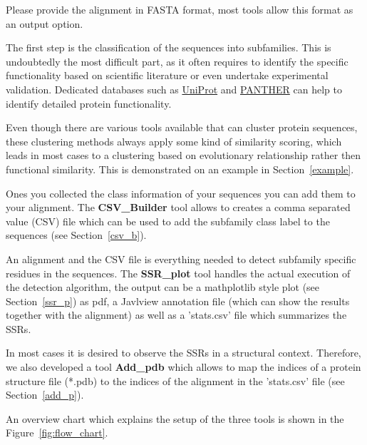 \documentclass[a4paper,10pt]{article}
\begin{document}
Please provide the alignment in FASTA format, most tools allow this format as
an output option.

The first step is the classification of the sequences into subfamilies.
This is undoubtedly the most difficult part, as it often requires 
to identify the specific functionality based on scientific literature
or even undertake experimental validation. Dedicated databases such as 
\href{https://www.uniprot.org/}{UniProt} and \href{http://www.pantherdb.org/downloads/index.jsp}{PANTHER} 
can help to identify 
detailed protein functionality. 

Even though there are various tools available that can cluster protein sequences, 
these clustering methods always apply some kind of similarity scoring,
which leads in most cases to a clustering based on evolutionary relationship 
rather then functional similarity. 
This is demonstrated on an example in Section~\ref{example}.

Ones you collected the class information of your sequences you can add
them to your alignment. The \textbf{CSV\_Builder} tool allows to creates 
a comma separated value (CSV) file which can be used to add the subfamily 
class label to the sequences
(see Section~\ref{csv_b}).

An alignment and the CSV file is everything needed to 
detect subfamily specific residues in the sequences. 
The \textbf{SSR\_plot} tool handles the actual execution of the detection
algorithm, the output can be a mathplotlib \cite{hunter_matplotlib:_2007} style plot (see Section~\ref{ssr_p})
as pdf, a Javlview annotation file \cite{clamp_jalview_2004} (which can show the results together with the 
alignment) as well as a 'stats.csv' file which summarizes the SSRs.

In most cases it is desired to observe the SSRs in a structural context.
Therefore, we also developed a tool \textbf{Add\_pdb} which allows
to map the indices of a protein structure file (*.pdb) to the indices of the 
alignment in the 'stats.csv' file (see Section~\ref{add_p}).

An overview chart which explains the setup of the three tools is shown in
the Figure~\ref{fig:flow_chart}.
\end{document}
